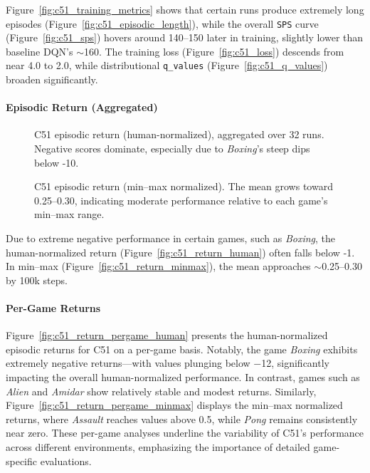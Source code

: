 Figure~\vref{fig:c51_training_metrics} shows that certain runs produce extremely long episodes 
(Figure~\ref{fig:c51_episodic_length}), 
while the overall \texttt{SPS} curve (Figure~\ref{fig:c51_sps}) hovers around 140--150 later in training, 
slightly lower than baseline DQN's $\sim$\num{160}. 
The training loss (Figure~\ref{fig:c51_loss}) descends from near 4.0 to 2.0, 
while distributional \texttt{q\_values} (Figure~\ref{fig:c51_q_values}) broaden significantly.

\paragraph{Episodic Return (Aggregated)}

\begin{figure}
	\centering
	
	\caption{C51 episodic return (human-normalized), aggregated over 32 runs. 
		Negative scores dominate, especially due to \emph{Boxing}'s steep dips below -10.}
	\label{fig:c51_return_human}
\end{figure}

\begin{figure}
	\centering
	
	\caption{C51 episodic return (min--max normalized). 
		The mean grows toward 0.25--0.30, indicating moderate performance relative to each game's min--max range.}
	\label{fig:c51_return_minmax}
\end{figure}

Due to extreme negative performance in certain games, such as \emph{Boxing}, 
the human-normalized return (Figure~\vref{fig:c51_return_human}) 
often falls below -1. In min--max (Figure~\vref{fig:c51_return_minmax}), 
the mean approaches $\sim$\num{0.25}--\num{0.30} by 100k steps.

\paragraph{Per-Game Returns}
Figure~\ref{fig:c51_return_pergame_human} presents the human-normalized episodic returns for C51 on a per-game basis. Notably, the game \emph{Boxing} exhibits extremely negative returns—with values plunging below \num{-12}, significantly impacting the overall human-normalized performance. In contrast, games such as \emph{Alien} and \emph{Amidar} show relatively stable and modest returns. Similarly, Figure~\ref{fig:c51_return_pergame_minmax} displays the min--max normalized returns, where \emph{Assault} reaches values above \num{0.5}, while \emph{Pong} remains consistently near zero. These per-game analyses underline the variability of C51's performance across different environments, emphasizing the importance of detailed game-specific evaluations.

